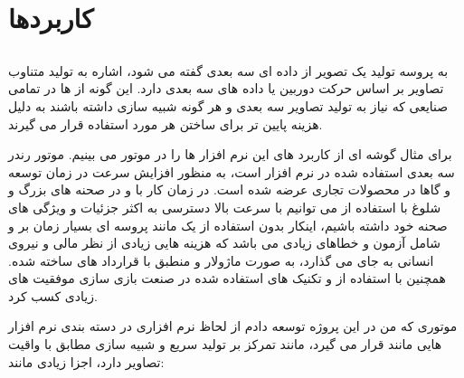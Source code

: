 \documentclass[a4paper, 12pt]{report}
\begin{document}
\newpage
\section{\fontsize{15pt}{1.0cm}\zarbold\textbf{کاربردها}}
\vspace*{0.6cm}
\noindent
\normalsize
    \subsection{}
     به پروسه تولید یک تصویر از داده ای سه بعدی گفته می شود،  اشاره به تولید متناوب تصاویر بر اساس حرکت دوربین یا داده های سه بعدی دارد.
    این گونه از  ها در تمامی صنایعی که نیاز به تولید تصاویر سه بعدی و هر گونه شبیه سازی داشته باشند به دلیل هزینه پایین تر برای ساختن هر  مورد استفاده قرار می گیرند.\par
     برای مثال گوشه ای از کاربرد های این نرم افزار ها را در موتور  می بینیم.  موتور رندر سه بعدی  استفاده شده در نرم افزار  است،  به منظور افزایش سرعت در زمان توسعه و گاها در محصولات تجاری عرضه شده است.
    در زمان کار با  و در صحنه های بزرگ و شلوغ با استفاده از  می توانیم با سرعت بالا دسترسی به اکثر جزئیات و ویژگی های صحنه خود داشته باشیم، اینکار بدون استفاده از  یک  مانند  پروسه ای بسیار زمان بر و شامل آزمون و خطاهای زیادی می باشد که هزینه هایی زیادی از نظر مالی و نیروی انسانی به جای می گذارد،  به صورت ماژولار و منطبق با قرارداد های  ساخته شده. همچنین    با استفاده از  و تکنیک های   استفاده شده در صنعت بازی سازی موفقیت های زیادی کسب کرد.\par
    موتوری که من در این پروژه توسعه دادم از لحاظ نرم افزاری در دسته بندی نرم افزار هایی مانند  قرار می گیرد،  مانند  تمرکز بر تولید سریع و شبیه سازی مطابق با واقیت تصاویر دارد، اجزا زیادی مانند:
\end{document}
